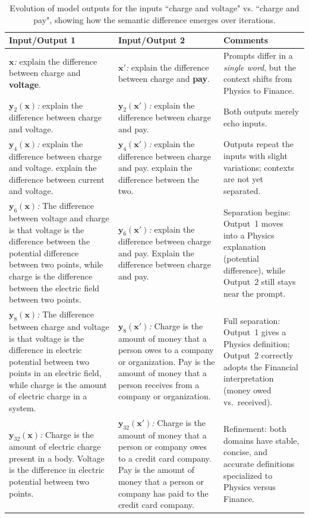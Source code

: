 \documentclass{amsart} %
\def\vx{{\bm{x}}}
\def\vy{{\bm{y}}}
\theoremstyle{definition}
\theoremstyle{remark}
\begin{document}
\begin{table}[t]
\centering
\caption{Evolution of model outputs for the inputs ``charge and voltage" vs. ``charge and pay", showing how the semantic difference emerges over iterations.}
\label{tab:charge_context_shift}
\scriptsize
\renewcommand{\arraystretch}{1.5}
\begin{tabular}{p{} p{} p{}}
\hline
\textbf{Input/Output 1} & \textbf{Input/Output 2} & \textbf{Comments} \\ \hline
\textit{$\vx$:} explain the difference between charge and \textbf{voltage}. & \textit{$\vx'$:} explain the difference between charge and \textbf{pay}. & Prompts differ in a \emph{single word}, but the context shifts from Physics to Finance. \\ \hline
\textit{$\vy_2(\vx)$:} explain the difference between charge and {voltage}. & \textit{$\vy_2(\vx')$:} explain the difference between charge and {pay}. & Both outputs merely echo inputs. \\ \hline
\textit{$\vy_4(\vx)$:} explain the difference between charge and {voltage}. explain the difference between current and voltage. & 
\textit{$\vy_4(\vx')$:} explain the difference between charge and {pay}. explain the difference between the two. & Outputs repeat the inputs with slight variations; contexts are not yet separated. \\ \hline
\textit{$\vy_6(\vx)$:} The difference between voltage and charge is that voltage is the difference between the potential difference between two points, while charge is the difference between the electric field between two points. & \textit{$\vy_6(\vx')$:} explain the difference between charge and {pay}. Explain the difference between charge and pay. & {Separation begins:} Output~1 moves into a Physics explanation (potential difference), while Output~2 still stays near the prompt. \\ \hline
\textit{$\vy_8(\vx)$:} The difference between charge and voltage is that voltage is the difference in electric potential between two points in an electric field, while charge is the amount of electric charge in a system. & \textit{$\vy_8(\vx')$:} Charge is the amount of money that a person owes to a company or organization. Pay is the amount of money that a person receives from a company or organization. & Full separation: Output~1 gives a Physics definition; Output~2 correctly adopts the Financial interpretation (money owed vs.\ received). \\ \hline
\textit{$\vy_{32}(\vx)$:} Charge is the amount of electric charge present in a body. Voltage is the difference in electric potential between two points. & \textit{$\vy_{32}(\vx')$:} Charge is the amount of money that a person or company owes to a credit card company. Pay is the amount of money that a person or company has paid to the credit card company. & Refinement: both domains have stable, concise, and accurate definitions specialized to Physics versus Finance. \\ \hline
\end{tabular}
\end{table}
\end{document}
